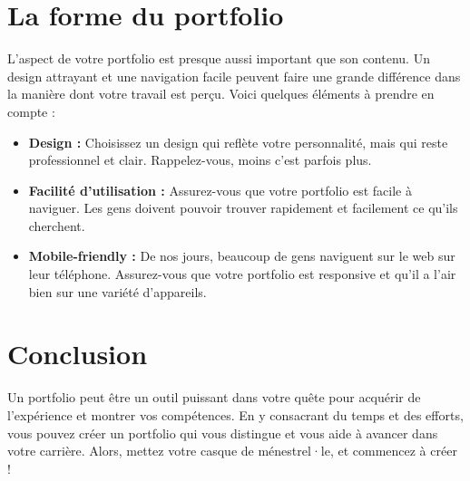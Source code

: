 \section{La forme du portfolio}

L'aspect de votre portfolio est presque aussi important que son contenu. Un design attrayant et une navigation facile peuvent faire une grande différence dans la manière dont votre travail est perçu. Voici quelques éléments à prendre en compte :

\begin{itemize}
  \item \textbf{Design :} Choisissez un design qui reflète votre personnalité, mais qui reste professionnel et clair. Rappelez-vous, moins c'est parfois plus.
  \item \textbf{Facilité d'utilisation :} Assurez-vous que votre portfolio est facile à naviguer. Les gens doivent pouvoir trouver rapidement et facilement ce qu'ils cherchent.
  \item \textbf{Mobile-friendly :} De nos jours, beaucoup de gens naviguent sur le web sur leur téléphone. Assurez-vous que votre portfolio est responsive et qu'il a l'air bien sur une variété d'appareils.
\end{itemize}

\section{Conclusion}

Un portfolio peut être un outil puissant dans votre quête pour acquérir de l'expérience et montrer vos compétences. En y consacrant du temps et des efforts, vous pouvez créer un portfolio qui vous distingue et vous aide à avancer dans votre carrière. Alors, mettez votre casque de ménestrel·le, et commencez à créer !


